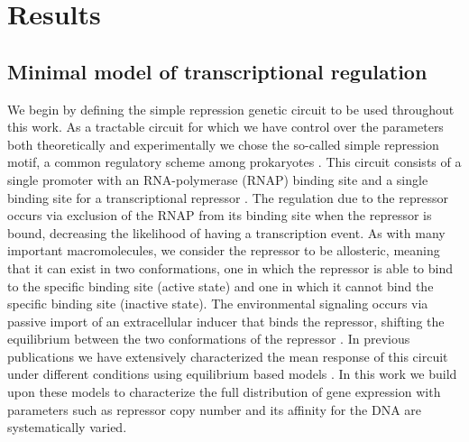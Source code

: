 \section{Results}

\subsection{Minimal model of transcriptional regulation}\label{sec_model}

We begin by defining the simple repression genetic circuit to be used throughout
this work. As a tractable circuit for which we have control over the parameters
both theoretically and experimentally we chose the so-called simple  repression
motif, a common regulatory scheme among prokaryotes \cite{Rydenfelt2014}. This
circuit consists of a single promoter with an RNA-polymerase (RNAP) binding site
and a single binding site for a transcriptional repressor \cite{Garcia2011c}.
The regulation due to the repressor occurs via exclusion of the RNAP from its
binding site when the repressor is bound, decreasing the likelihood of having a
transcription event. As with many important macromolecules, we consider the
repressor to be allosteric, meaning that it can exist in two conformations, one
in which the repressor is able to bind to the specific binding site (active
state) and one in which it cannot bind the specific binding site (inactive
state). The environmental signaling occurs via passive import of an
extracellular inducer that binds the repressor, shifting the equilibrium between
the two conformations of the repressor \cite{Razo-Mejia2018}. In previous
publications we have extensively characterized the mean response of this circuit
under different conditions using equilibrium based models \cite{Phillips2019}.
In this work we build upon these models to characterize the full distribution of
gene expression with parameters such as repressor copy number and its affinity
for the DNA are systematically varied.

